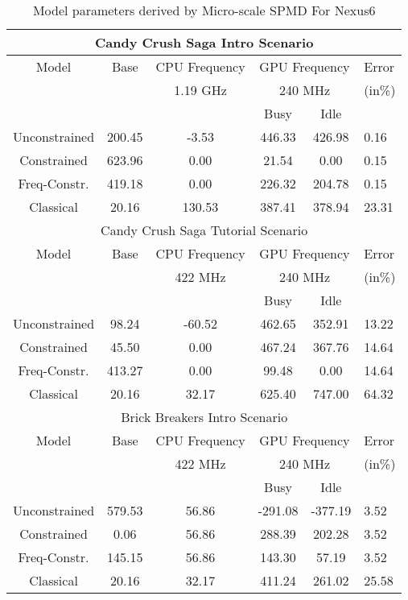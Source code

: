 \begin{table}[]
\caption{Model parameters derived by Micro-scale SPMD For Nexus6}
\vspace{-0.1in}
{\footnotesize
    \begin{tabular}{|c|c|c|c|c|p{5.4mm}|}
    \hline
    \multicolumn{6}{|c|}{Candy Crush Saga Intro Scenario} \\
        \hline
        Model & Base & \multicolumn{1}{c|}{CPU Frequency} & \multicolumn{2}{c|}{GPU Frequency} & Error \\
        \cline{3-5}
        &  & 1.19 GHz & \multicolumn{2}{c|}{240 MHz} & (in\%)\\
        \cline{3-5}
                & & \multicolumn{1}{|c|}{} & Busy & Idle & \\
        \hline
        Unconstrained & 200.45 & -3.53 & 446.33 & 426.98 & 0.16 \\
        Constrained & 623.96 & 0.00 & 21.54 & 0.00 & 0.15 \\
        Freq-Constr. & 419.18 & 0.00 & 226.32 & 204.78 & 0.15 \\
        \hline
        Classical & 20.16 & 130.53 & 387.41 & 378.94 & 23.31 \\
        \hline

    \multicolumn{6}{|c|}{Candy Crush Saga Tutorial Scenario} \\
        \hline
        Model & Base & \multicolumn{1}{c|}{CPU Frequency} & \multicolumn{2}{c|}{GPU Frequency} & Error \\
        \cline{3-5}
        &  & 422 MHz & \multicolumn{2}{c|}{240 MHz} & (in\%)\\
        \cline{3-5}
                & & \multicolumn{1}{|c|}{} & Busy & Idle & \\
        \hline
        Unconstrained & 98.24 & -60.52 & 462.65 & 352.91 & 13.22 \\
        Constrained & 45.50 & 0.00 & 467.24 & 367.76 & 14.64 \\
        Freq-Constr. & 413.27 & 0.00 & 99.48 & 0.00 & 14.64 \\
        \hline
        Classical & 20.16 & 32.17 & 625.40 & 747.00 & 64.32 \\
        \hline

    \multicolumn{6}{|c|}{Brick Breakers Intro Scenario} \\
        \hline
        Model & Base & \multicolumn{1}{c|}{CPU Frequency} & \multicolumn{2}{c|}{GPU Frequency} & Error \\
        \cline{3-5}
        &  & 422 MHz & \multicolumn{2}{c|}{240 MHz} & (in\%) \\
        \cline{3-5}
                & & \multicolumn{1}{|c|}{} & Busy & Idle & \\
        \hline
        Unconstrained & 579.53 & 56.86 & -291.08 & -377.19 & 3.52 \\
        Constrained & 0.06 & 56.86 & 288.39 & 202.28 & 3.52 \\
        Freq-Constr. & 145.15 & 56.86 & 143.30 & 57.19 & 3.52 \\
        \hline
        Classical & 20.16 & 32.17 & 411.24 & 261.02 & 25.58 \\
        \hline


\end{tabular}}
\end{table}
